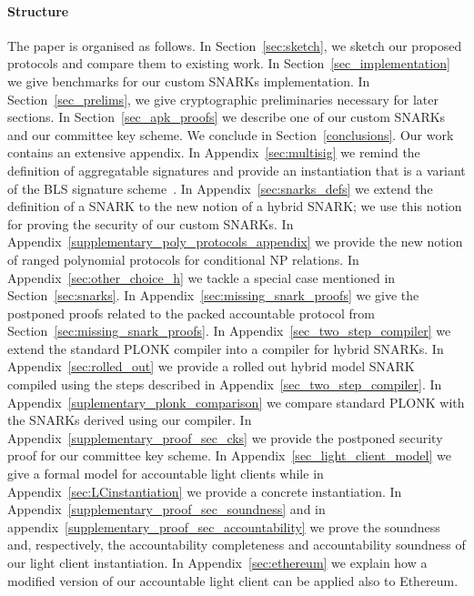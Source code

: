 \paragraph{Structure} The paper is organised as follows.
In Section~\ref{sec:sketch}, we sketch our proposed protocols and compare
them to existing work. In
Section~\ref{sec_implementation} we give benchmarks for our custom SNARKs
implementation.
In Section~\ref{sec_prelims}, we give cryptographic
preliminaries necessary for later sections. In Section~\ref{sec_apk_proofs}
we describe one of our custom SNARKs and our committee key scheme.
We conclude in Section~\ref{conclusions}. Our work contains an extensive appendix. 
In Appendix~\ref{sec:multisig} we remind the definition of aggregatable signatures and provide an 
instantiation that is a variant of the BLS signature scheme~\cite{BLS_signatures}. 
In Appendix~\ref{sec:snarks_defs} we extend the definition of a SNARK to the new notion of a hybrid SNARK; 
we use this notion for proving the security of our custom SNARKs. 
In Appendix~\ref{supplementary_poly_protocols_appendix} we provide the new notion of ranged polynomial protocols for conditional NP relations. 
In Appendix~\ref{sec:other_choice_h} we tackle a special case mentioned in Section~\ref{sec:snarks}. 
In Appendix~\ref{sec:missing_snark_proofs} we give the postponed proofs related to the packed accountable protocol from Section~\ref{sec:missing_snark_proofs}. 
In Appendix~\ref{sec_two_step_compiler} we extend the standard PLONK compiler into a compiler for hybrid SNARKs. 
In Appendix~\ref{sec:rolled_out} we provide a rolled out hybrid model SNARK compiled using the steps described in Appendix~\ref{sec_two_step_compiler}.
In Appendix~\ref{suplementary_plonk_comparison} we compare standard PLONK with the SNARKs derived using our compiler. 
In Appendix~\ref{supplementary_proof_sec_cks} we provide the postponed security proof for our committee key scheme. 
In Appendix~\ref{sec_light_client_model} we give a formal model for accountable light clients while in  
Appendix~\ref{sec:LCinstantiation} we provide a concrete instantiation. 
In Appendix~\ref{supplementary_proof_sec_soundness} and in appendix~\ref{supplementary_proof_sec_accountability} 
we prove the soundness and, respectively, the accountability completeness and accountability soundness of our light client instantiation. 
In Appendix~\ref{sec:ethereum} we explain how a modified version of our accountable light client can be applied also to Ethereum. 


\vspace{-0.25cm}
